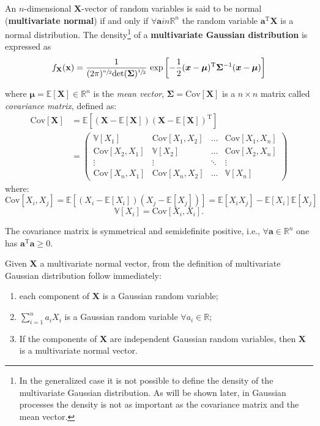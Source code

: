 \begin{defi} An $n$-dimensional $\mathbf{X}$-vector of random variables is said to be normal (\textbf{multivariate normal}) if and only if $\forall \mathbf{a} in \mathbb{R}^n$ the random variable $\mathbf{a}^\text{T}\mathbf{X}$ is a normal distribution.  
    The density\footnote{In the generalized case it is not possible to define the density of the multivariate Gaussian distribution. As will be shown later, in Gaussian processes the density is not as important as the covariance matrix and the mean vector.} of a \textbf{multivariate Gaussian distribution} is expressed as
\[f_{\mathbf{X}}(\mathbf{x})=\frac{1}{(2\pi)^{\sfrac{n}{2}}  \text{det}(\bm{\Sigma})^{\sfrac{1}{2}}} \text{ exp}\left[-\frac{1}{2}(\bm{x}-\bm{\mu})^\text{T}\bm{\Sigma}^{-1}(\bm{x}-\bm{\mu})\right]
\]\end{defi}
where $\bm{\mu}=\mathbb{E}[\bm{X}]\in \mathbb{R}^n$ is the  \textit{mean vector}, $\bm{\Sigma}=\text{Cov}[\bm{X}]$ is a $n\times n$ matrix called \textit{covariance matrix}, defined as:
\[\begin{split}
\text{Cov}[\bm{X}] &= \mathbb{E}\left[(\bm{X}-\mathbb{E}[\bm{X}])(\bm{X}-\mathbb{E}[\bm{X}])^\text{T} \right]\\
 & = \begin{pmatrix}
    \mathbb{V}[X_1] & \text{Cov}[X_1,X_2] & \dots & \text{Cov}[X_1,X_n]\\
    \text{Cov}[X_2,X_1] & \mathbb{V}[X_2] & \dots & \text{Cov}[X_2,X_n]\\
    \vdots & \vdots & \ddots & \vdots\\
    \text{Cov}[X_n,X_1] & \text{Cov}[X_n,X_2] & \dots & \mathbb{V}[X_n]
    \end{pmatrix}
\end{split}
\]
where:
\[ \text{Cov}[X_i,X_j]=\mathbb{E}[(X_i-\mathbb{E}[X_i])(X_j-\mathbb{E}[X_j])] = \mathbb{E}[X_iX_j]-\mathbb{E}[X_i]\mathbb{E}[X_j]  \]
\[ \mathbb{V}[X_i]=\text{Cov}[X_i, X_i]. \]


\begin{oss}\label{ossGaussianaMultivariata}
    The covariance matrix is symmetrical and semidefinite positive, i.e., $\forall \mathbf{a} \in \mathbb{R}^n$ one has $\mathbf{a}^\text{T} \mathbf{a}\geq 0$.
\end{oss}


\begin{cor}
    Given $\mathbf{X}$ a multivariate normal vector, from the definition of multivariate Gaussian distribution follow immediately:
\begin{enumerate}
    \item each component of $\mathbf{X}$ is a Gaussian random variable;
    \item $\sum_{i=1}^{n} a_iX_i$ is a Gaussian random variable $\forall a_i\in \mathbb{R}$;
    \item If the components of $\mathbf{X}$ are independent Gaussian random variables, then $\mathbf{X}$ is a multivariate normal vector.
\end{enumerate}
\end{cor}

